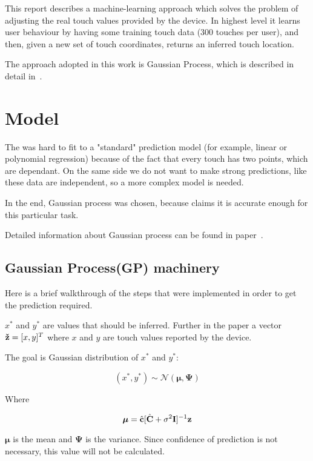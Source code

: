 \documentclass[english,11pt]{article}
\numberwithin{equation}{section}
\begin{document}
This report describes a machine-learning approach which solves the problem of
adjusting the real touch values provided by the device. In highest level it
learns user behaviour by having some training touch data (300 touches per user),
and then, given a new set of touch coordinates, returns an inferred touch
location.

The approach adopted in this work is Gaussian Process, which is described in
detail in~\cite{WeiRogMur}.

\section{Model}

The was hard to fit to a "standard" prediction model (for example, linear
or polynomial regression) because of the fact that every touch has two points,
which are dependant. On the same side we do not want to make strong predictions,
like these data are independent, so a more complex model is needed.

In the end, Gaussian process was chosen, because \cite{WeiRogMur} claims
it is accurate enough for this particular task.

Detailed information about Gaussian process can be found in paper~\cite{GP}.

\subsection{Gaussian Process(GP) machinery}

\newcommand{\z}{\textrm{\bf{\v{z}}}}
\newcommand{\zn}{\textrm{\bf{\v{z}$_n$}}}
\newcommand{\zm}{\textrm{\bf{\v{z}$_m$}}}

Here is a brief walkthrough of the steps that were implemented in order to get
the prediction required.

$x^*$ and $y^*$ are values that should be inferred. Further in the paper a
vector $\z = [x, y]^T$ where $x$ and $y$ are touch values reported by the
device.

The goal is Gaussian
distribution of $x^*$ and $y^*$:

$$ (x^*, y^*) \sim \mathcal{N}(\bm{\mu}, \bm{\Psi}) $$

Where

$$ \bm{\mu} = \hat{\textrm{\bf{c}}} [ \hat{\textrm{\bf{C}}} +
    \sigma^2 \textrm{\bf{I}} ]^{-1} \textrm{\bf{z}}
$$

$\bm{\mu}$ is the mean and $\bm{\Psi}$ is the variance. Since confidence of
prediction is not necessary, this value will not be calculated.
\end{document}
